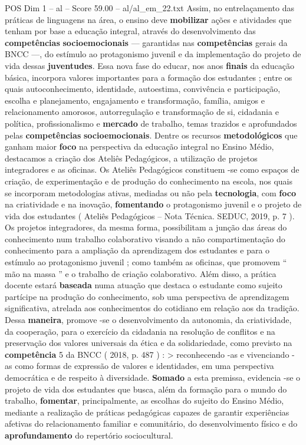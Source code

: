 \begin{textsample}{POS Dim 1 – al – Score 59.00 – al/al\_em\_22.txt}
Assim, no entrelaçamento das práticas de linguagens na área, o ensino deve \textbf{mobilizar} ações e atividades que tenham por base a educação integral, através do desenvolvimento das \textbf{competências} \textbf{socioemocionais} — garantidas nas \textbf{competências} gerais da BNCC —, do estímulo ao protagonismo juvenil e da implementação do projeto de vida dessas \textbf{juventudes}.
Essa nova fase do educar, nos anos \textbf{finais} da educação básica, incorpora valores importantes para a formação dos estudantes ; entre os quais autoconhecimento, identidade, autoestima, convivência e participação, escolha e planejamento, engajamento e transformação, família, amigos e relacionamento amorosos, autorregulação e transformação de si, cidadania e política, profissionalismo e \textbf{mercado} de trabalho, temas trazidos e aprofundados pelas \textbf{competências} \textbf{socioemocionais}.
Dentre os recursos \textbf{metodológicos} que ganham maior \textbf{foco} na perspectiva da educação integral no Ensino Médio, destacamos a criação dos Ateliês Pedagógicos, a utilização de projetos integradores e as oficinas.
Os Ateliês Pedagógicos constituem -se como espaços de criação, de experimentação e de produção do conhecimento na escola, nos quais se incorporam metodologias ativas, mediadas ou não pela \textbf{tecnologia}, com \textbf{foco} na criatividade e na inovação, \textbf{fomentando} o protagonismo juvenil e o projeto de vida dos estudantes ( Ateliês Pedagógicos – Nota Técnica.
SEDUC, 2019, p. 7 ).
Os projetos integradores, da mesma forma, possibilitam a junção das áreas do conhecimento num trabalho colaborativo visando a não compartimentação do conhecimento para a ampliação da aprendizagem dos estudantes e para o estímulo ao protagonismo juvenil ; como também as oficinas, que promovem “ mão na massa ” e o trabalho de criação colaborativo.
Além disso, a prática docente estará \textbf{baseada} numa atuação que destaca o estudante como sujeito partícipe na produção do conhecimento, sob uma perspectiva de aprendizagem significativa, atrelada aos conhecimentos do cotidiano em relação aos da tradição.
Dessa \textbf{maneira}, promove -se o desenvolvimento da autonomia, da criatividade, da cooperação, para o exercício da cidadania na resolução de conflitos e na preservação dos valores universais da ética e da solidariedade, como previsto na \textbf{competência} 5 da BNCC ( 2018, p. 487 ) : > reconhecendo -as e vivenciando -as como formas de expressão de valores e identidades, em uma perspectiva democrática e de respeito à diversidade. \textbf{Somado} a esta premissa, evidencia -se o projeto de vida dos estudantes que busca, além da formação para o mundo do trabalho, \textbf{fomentar}, principalmente, as escolhas do sujeito do Ensino Médio, mediante a realização de práticas pedagógicas capazes de garantir experiências afetivas do relacionamento familiar e comunitário, do desenvolvimento físico e do \textbf{aprofundamento} do repertório sociocultural.

\end{textsample}
